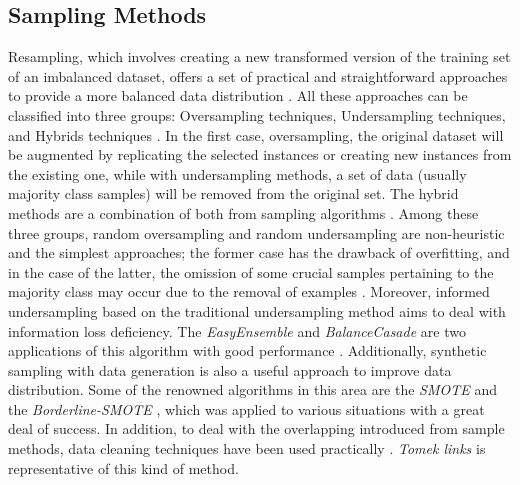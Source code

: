 \subsection{Sampling Methods}
Resampling, which involves creating a new transformed version of the training set of an imbalanced dataset, offers a set of practical and straightforward approaches to provide a more balanced data distribution \cite{9}. All these approaches can be classified into three groups: Oversampling techniques, Undersampling techniques, and Hybrids techniques \cite{10}. In the first case, oversampling, the original dataset will be augmented by replicating the selected instances or creating new instances from the existing one, while with undersampling methods, a set of data (usually majority class samples) will be removed from the original set. The hybrid methods are a combination of both from sampling algorithms \cite{10}. Among these three groups, random oversampling and random undersampling are non-heuristic and the simplest approaches; the former case has the drawback of overfitting, and in the case of the latter, the omission of some crucial samples pertaining to the majority class may occur due to the removal of examples \cite{17}. Moreover, informed undersampling based on the traditional undersampling method aims to deal with information loss deficiency. The \textit{EasyEnsemble} and \textit{BalanceCasade} are two applications of this algorithm with good performance \cite{12}. Additionally, synthetic sampling with data generation is also a useful approach to improve data distribution. Some of the renowned algorithms in this area are the \textit{SMOTE} \cite{13} and the \textit{Borderline-SMOTE} \cite{15}, which was applied to various situations with a great deal of success. In addition, to deal with the overlapping introduced from sample methods, data cleaning techniques have been used practically \cite{17}. \textit{Tomek links} \cite{16} is representative of this kind of method. 

